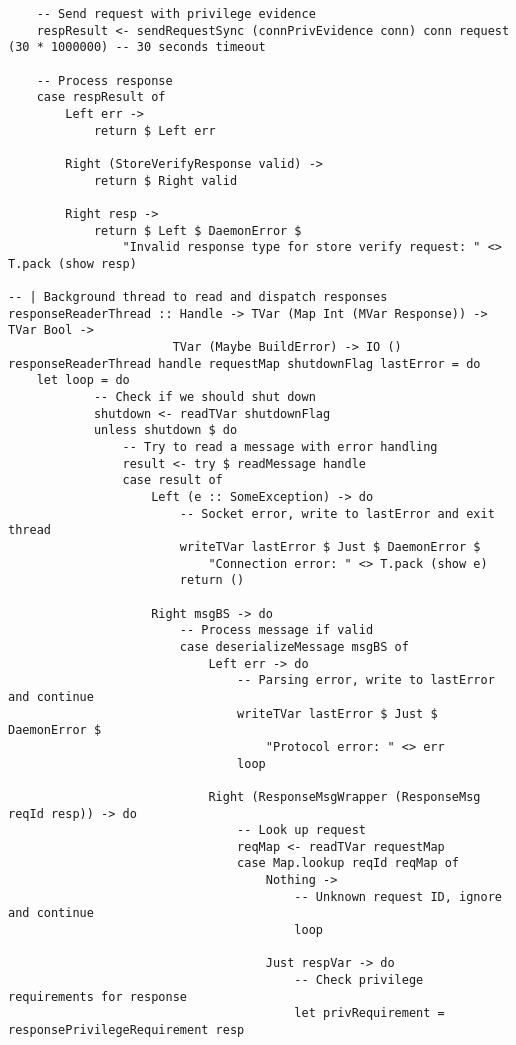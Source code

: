 \documentclass{article}
\begin{document}
\begin{tcolorbox}[title=Ten/Daemon/Client.hs Changes]
\begin{verbatim}
    -- Send request with privilege evidence
    respResult <- sendRequestSync (connPrivEvidence conn) conn request (30 * 1000000) -- 30 seconds timeout

    -- Process response
    case respResult of
        Left err ->
            return $ Left err

        Right (StoreVerifyResponse valid) ->
            return $ Right valid

        Right resp ->
            return $ Left $ DaemonError $
                "Invalid response type for store verify request: " <> T.pack (show resp)

-- | Background thread to read and dispatch responses
responseReaderThread :: Handle -> TVar (Map Int (MVar Response)) -> TVar Bool ->
                       TVar (Maybe BuildError) -> IO ()
responseReaderThread handle requestMap shutdownFlag lastError = do
    let loop = do
            -- Check if we should shut down
            shutdown <- readTVar shutdownFlag
            unless shutdown $ do
                -- Try to read a message with error handling
                result <- try $ readMessage handle
                case result of
                    Left (e :: SomeException) -> do
                        -- Socket error, write to lastError and exit thread
                        writeTVar lastError $ Just $ DaemonError $
                            "Connection error: " <> T.pack (show e)
                        return ()

                    Right msgBS -> do
                        -- Process message if valid
                        case deserializeMessage msgBS of
                            Left err -> do
                                -- Parsing error, write to lastError and continue
                                writeTVar lastError $ Just $ DaemonError $
                                    "Protocol error: " <> err
                                loop

                            Right (ResponseMsgWrapper (ResponseMsg reqId resp)) -> do
                                -- Look up request
                                reqMap <- readTVar requestMap
                                case Map.lookup reqId reqMap of
                                    Nothing ->
                                        -- Unknown request ID, ignore and continue
                                        loop

                                    Just respVar -> do
                                        -- Check privilege requirements for response
                                        let privRequirement = responsePrivilegeRequirement resp


\end{verbatim}
\end{tcolorbox}
\end{document}
